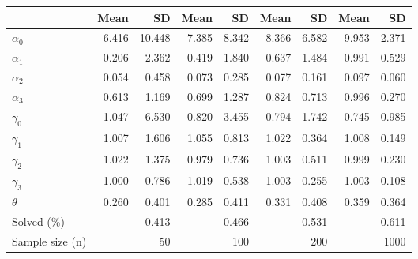 
\begin{tabular}[t]{lrrrrrrrr}
\toprule
  & Mean & SD & Mean  & SD  & Mean   & SD   & Mean    & SD   \\
\midrule
$\alpha_{0}$ & 6.416 & 10.448 & 7.385 & 8.342 & 8.366 & 6.582 & 9.953 & 2.371\\
$\alpha_{1}$ & 0.206 & 2.362 & 0.419 & 1.840 & 0.637 & 1.484 & 0.991 & 0.529\\
$\alpha_{2}$ & 0.054 & 0.458 & 0.073 & 0.285 & 0.077 & 0.161 & 0.097 & 0.060\\
$\alpha_{3}$ & 0.613 & 1.169 & 0.699 & 1.287 & 0.824 & 0.713 & 0.996 & 0.270\\
$\gamma_{0}$ & 1.047 & 6.530 & 0.820 & 3.455 & 0.794 & 1.742 & 0.745 & 0.985\\
$\gamma_{1}$ & 1.007 & 1.606 & 1.055 & 0.813 & 1.022 & 0.364 & 1.008 & 0.149\\
$\gamma_{2}$ & 1.022 & 1.375 & 0.979 & 0.736 & 1.003 & 0.511 & 0.999 & 0.230\\
$\gamma_{3}$ & 1.000 & 0.786 & 1.019 & 0.538 & 1.003 & 0.255 & 1.003 & 0.108\\
$\theta$ & 0.260 & 0.401 & 0.285 & 0.411 & 0.331 & 0.408 & 0.359 & 0.364\\
Solved (\%) &  & 0.413 &  & 0.466 &  & 0.531 &  & 0.611\\
Sample size (n) &  & 50 &  & 100 &  & 200 &  & 1000\\
\bottomrule
\end{tabular}
